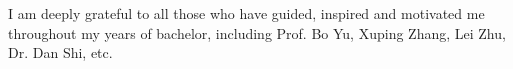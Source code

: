 \begin{acknowledgement}

	I am deeply grateful to all those who have guided, inspired and motivated me throughout my years of bachelor, including Prof. Bo Yu, Xuping Zhang, Lei Zhu, Dr. Dan Shi, etc.


\end{acknowledgement}
